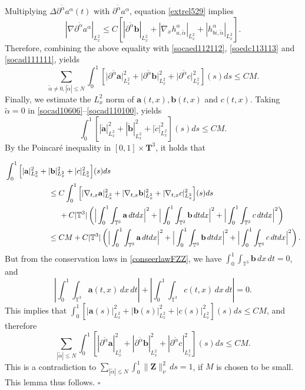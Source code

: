 \documentclass[reqno]{amsart}
\numberwithin{equation}{section}
\numberwithin{equation}{section}
\begin{document}
		Multiplying $\Delta\partial^{\tilde{\alpha}} a^{\alpha}(t)$ with $\partial^{\tilde{\alpha}} a^{\alpha}$, equation \eqref{extrel529} implies
		$$
		|\nabla \partial^{\tilde{\alpha}} a^\alpha|_{L_x^2} \le C \left[ |\partial^{\tilde{\alpha}} \mathbf{b}|_{L_x^2} + |\nabla_x h_{a,\tilde{\alpha}}^\alpha|_{L_x^2} + |h_{bi,\tilde{\alpha}}^\alpha|_{L_x^2} \right].
		$$
		Therefore, combining the above equality with \eqref{socaed112112}, \eqref{soedc113113} and \eqref{socad111111}, yields
		$$
		\sum_{\tilde{\alpha} \neq 0, |\tilde{\alpha}| \leq N} \int_0^1 \left[ \big|\partial^{\tilde{\alpha}} \mathbf{a}\big|_{L_x^2}^2 + \big|\partial^{\tilde{\alpha}} \mathbf{b}\big|_{L_x^2}^2 + \big|\partial^{\tilde{\alpha}} c\big|_{L_x^2}^2 \right] (s) ds \le C M.
		$$
		Finally, we estimate the $L^2_x$ norm of $\mathbf{a}(t,x), \mathbf{b}(t,x)$ and $c(t,x)$. Taking $\tilde{\alpha} = 0$ in  \eqref{socad10606}--\eqref{socad110100}, yields
		$$
		\int_0^1 \left[ |\dot{\mathbf{a}}|_{L_x^2}^2 + |\dot{\mathbf{b}}|_{L_x^2}^2 + |\dot{c}|_{L_x^2}^2 \right] (s) ds \le C M.
		$$
		By the Poincaré inequality in $[0,1] \times \mathbf{T}^3$, it holds that
		
		\begin{align*}
			&\int_0^1 \Big[ |\mathbf{a}|_{L_x^2}^2 + |\mathbf{b}|_{L_x^2}^2 + |c|_{L_x^2}^2 \Big] (s) ds \\
			&\hspace{2cm}\leq C \int_0^1 \Big[ |\nabla_{t,x} \mathbf{a}|_{L_x^2}^2 + |\nabla_{t,x} \mathbf{b}|_{L_x^2}^2 + |\nabla_{t,x} c|_{L_x^2}^2 \Big] (s) ds \\
			&\hspace{2.5cm} + C|\mathbb{T}^3| \left( \Big| \int_0^1 \int_{\mathbb{T}^3} \mathbf{a} \, dtdx \Big|^2 + \Big| \int_0^1 \int_{\mathbb{T}^3} \mathbf{b} \, dtdx \Big|^2 + \Big| \int_0^1 \int_{\mathbb{T}^3} c \, dtdx \Big|^2 \right) \\
			&\hspace{2cm}\leq CM + C|\mathbb{T}^3| \left( \Big| \int_0^1 \int_{\mathbb{T}^3} \mathbf{a} \, dtdx \Big|^2 + \Big| \int_0^1 \int_{\mathbb{T}^3} \mathbf{b} \, dtdx \Big|^2 + \Big| \int_0^1 \int_{\mathbb{T}^3} c \, dtdx \Big|^2 \right).
		\end{align*}
		But from the conservation laws in \eqref{conseerlawFZZ}, we have $\int_0^1 \int_{\mathbb{T}^3} \mathbf{b}\, dx\,dt = 0$, and
		$$
		\left| \int_0^1 \int_{\mathbb{T}^3}\mathbf{a}(t,x) \,dx\,dt\right| + \left| \int_0^1 \int_{\mathbb{T}^3} c (t,x) \,dx\,dt\right| = 0.
		$$
		This implies that $\int_0^1 \left[ |\mathbf{a}(s)|_{L_x^2}^2 + |\mathbf{b}(s)|_{L_x^2}^2 + |c(s)|_{L_x^2}^2 \right] (s) ds \le CM$, and therefore
		$$
		\sum_{|\tilde{\alpha}| \le N} \int_0^1 \left[ |\partial^{\tilde{\alpha}} \mathbf{a}|_{L_x^2}^2 + |\partial^{\tilde{\alpha}} \mathbf{b}|_{L_x^2}^2 + |\partial^{\tilde{\alpha}} c|_{L_x^2}^2 \right] (s) ds \le CM.
		$$
		This is a contradiction to $\sum_{|\tilde{\alpha}| \leq N} \int_0^1 \| \mathbf{Z} \|_{\nu}^2 \,ds = 1$, if $M$ is chosen to be small. This lemma thus follows. $\square$
		
\end{document}
